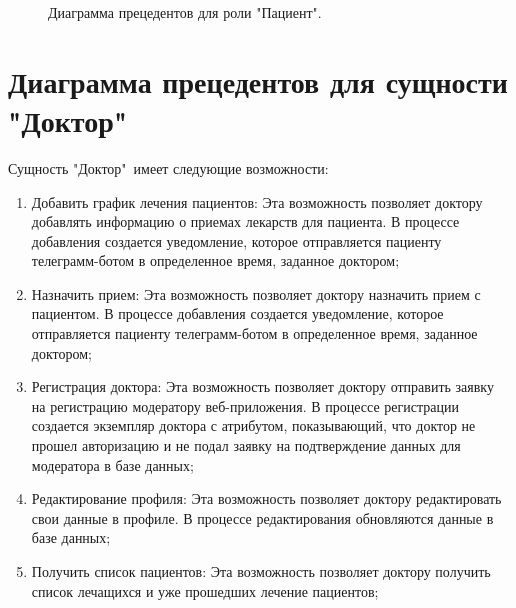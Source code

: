         \begin{figure}[H]%
            \centering
            \caption{Диаграмма прецедентов для роли "Пациент".} \label{patient_uml}
        \end{figure} 
    
    \section{Диаграмма прецедентов для сущности "Доктор"\ }
        Сущность "Доктор"\ имеет следующие возможности:
        \begin{enumerate}
            \item Добавить график лечения пациентов: Эта возможность %
            позволяет доктору добавлять информацию о приемах лекарств %
            для пациента. В процессе добавления создается уведомление, %
            которое отправляется пациенту телеграмм-ботом в определенное %
            время, заданное доктором;
            \item Назначить прием: Эта возможность позволяет доктору %
            назначить прием с пациентом. В процессе добавления создается %
            уведомление, которое отправляется пациенту телеграмм-ботом в %
            определенное время, заданное доктором;
            \item Регистрация доктора: Эта возможность позволяет доктору %
            отправить заявку на регистрацию модератору веб-приложения. %
            В процессе регистрации создается экземпляр доктора с %
            атрибутом, показывающий, что доктор не прошел авторизацию %
            и не подал заявку на подтверждение данных %
            для модератора в базе данных;
            \item Редактирование профиля: Эта возможность позволяет доктору %
            редактировать свои данные в профиле. В процессе редактирования %
            обновляются данные в базе данных;
            \item Получить список пациентов: Эта возможность позволяет доктору %
            получить список лечащихся и уже прошедших лечение пациентов;
        \end{enumerate}
        
